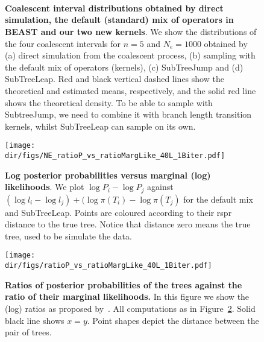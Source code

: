 \begin{figure}
\begin{center}
 \\
 \\
\\
\end{center}
\caption[Coalescent interval distributions obtained by direct simulation, the default (standard) mix of operators in BEAST and our two new kernels.]{\textbf{Coalescent interval distributions obtained by direct simulation, the default (standard) mix of operators in BEAST and our two new kernels}.
We show the distributions of the four coalescent intervals for $n = 5$ and $N_e = 1000$  obtained by (a) direct simulation from the coalescent process, (b) sampling with the default mix of operators (kernels), (c) SubTreeJump and (d) SubTreeLeap.
Red and black vertical dashed lines show the theoretical and estimated means, respectively, and the solid red line shows the theoretical density. 
To be able to sample with SubtreeJump, we need to combine it with branch length transition kernels, whilst SubTreeLeap can sample on its own.
}
\label{fig:coalIntervals}
\end{figure}
\begin{figure}[!ht]
\centering
\texttt{[image: \\dir/figs/NE\_ratioP\_vs\_ratioMargLike\_40L\_1Biter.pdf]}
\caption[Log posterior probabilities versus marginal (log) likelihoods.]{\textbf{Log posterior probabilities versus marginal (log) likelihoods}.
We plot $\log P_i - \log P_j$ against $(\log l_i - \log l_j) + (\log \pi(T_i) - \log\pi(T_j)$ for the default mix and SubTreeLeap.
Points are coloured according to their rspr distance to the true tree.
Notice that distance zero means the true tree, used to be simulate the data.
}
\label{fig:logP}
\end{figure}
\begin{figure}[!ht]
\centering
\texttt{[image: \\dir/figs/ratioP\_vs\_ratioMargLike\_40L\_1Biter.pdf]}
\caption[Ratios of posterior probabilities of the trees against the ratio of their marginal likelihoods.]{\textbf{Ratios of posterior probabilities of the trees against the ratio of their marginal likelihoods.}
In this figure we show the (log) ratios as proposed by~\cite{Hoehna2008}.
All computations as in Figure~\ref{fig:logP}.
Solid black line shows $x = y$.
Point shapes depict the distance between the pair of trees.
}
\label{fig:ratios}
\end{figure}  
